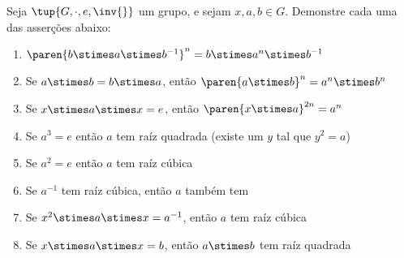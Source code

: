 \begin{exercise}
	Seja $\tup{G, \cdot, e, \inv{}}$ um grupo, e sejam $x, a, b \in G$.
	Demonstre cada uma das asserções abaixo:
	\begin{enumerate}
		\item $\paren{b \stimes a \stimes b^{-1}}^n = b \stimes a^n \stimes b^{-1}$
		\item Se $a \stimes b = b \stimes a$, então $\paren{a \stimes b}^n = a^n \stimes b^n$
		\item Se $x \stimes a \stimes x = e$, então $\paren{x \stimes a}^{2n} = a^n$
		\item Se $a^3 = e$ então $a$ tem raíz quadrada (existe um $y$ tal que $y^2 = a$)
		\item Se $a^2 = e$ então $a$ tem raíz cúbica  
		\item Se $a^{-1}$ tem raíz cúbica, então $a$ também tem
		\item Se $x^2 \stimes a \stimes x = a^{-1}$, então $a$ tem raíz cúbica
		\item Se $x \stimes a \stimes x = b$, então $a \stimes b$ tem raíz quadrada
	\end{enumerate}
\end{exercise}